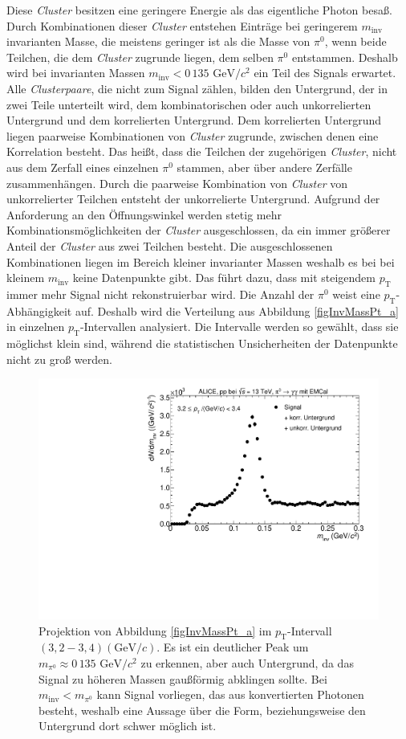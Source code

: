 Diese \textit{Cluster} besitzen eine geringere Energie als das eigentliche Photon besaß.
Durch Kombinationen dieser \textit{Cluster} entstehen Einträge bei geringerem $m_\text{inv}$
 invarianten Masse, die meistens geringer ist als die Masse von $\pi^{0}$, wenn beide Teilchen, die dem \textit{Cluster} zugrunde liegen, dem selben $\pi^{0}$ entstammen.
Deshalb wird bei invarianten Massen $m_\text{inv}<0\,135\text{ GeV}/c^{2}$ ein Teil des Signals erwartet.
\newline
Alle \textit{Clusterpaare}, die nicht zum Signal zählen, bilden den Untergrund, der in zwei Teile unterteilt wird, dem kombinatorischen oder auch unkorrelierten Untergrund und dem korrelierten Untergrund.
Dem korrelierten Untergrund liegen paarweise Kombinationen von \textit{Cluster} zugrunde, zwischen denen eine Korrelation besteht.
Das heißt, dass die Teilchen der zugehörigen \textit{Cluster}, nicht aus dem Zerfall eines einzelnen $\pi^{0}$ stammen, aber über andere Zerfälle zusammenhängen.
Durch die paarweise Kombination von \textit{Cluster} von unkorrelierter Teilchen entsteht der unkorrelierte Untergrund.
\newline
Aufgrund der Anforderung an den Öffnungswinkel werden stetig mehr Kombinationsmöglichkeiten der \textit{Cluster} ausgeschlossen, da ein immer  größerer Anteil der \textit{Cluster} aus zwei Teilchen besteht.
Die ausgeschlossenen Kombinationen liegen im Bereich kleiner invarianter Massen weshalb es bei bei kleinem $m_{\text{inv}}$ keine Datenpunkte gibt.
Das führt dazu, dass mit steigendem $p_{\text{T}}$ immer mehr Signal nicht rekonstruierbar wird.
\newline
Die Anzahl der $\pi^{0}$ weist eine $p_{\text{T}}$-Abhängigkeit auf.
Deshalb wird die Verteilung aus Abbildung \ref{figInvMassPt_a} in einzelnen $p_{\text{T}}$-Intervallen analysiert.
Die Intervalle werden so gewählt, dass sie möglichst klein sind, während die statistischen Unsicherheiten der Datenpunkte nicht zu groß werden.
\begin{figure}[tbp]
\centering
\includegraphics[width=.75\linewidth]{hSignalPlusBkg.pdf}
\caption{Projektion von Abbildung \ref{figInvMassPt_a} im $p_{\text{T}}$-Intervall $(3,2 - 3,4) (\text{GeV/}c)$. Es ist ein deutlicher Peak um $m_{\pi^{0}} \approx 0\,135\text{ GeV/}c^{2}$ zu erkennen, aber auch Untergrund, da das Signal zu höheren Massen gaußförmig abklingen sollte. Bei $m_{\text{inv}} < m_{\pi^{0}}$ kann Signal vorliegen, das aus konvertierten Photonen besteht, weshalb eine Aussage über die Form, beziehungsweise den Untergrund dort schwer möglich ist.}
\label{figSignalPlusBkg}
\end{figure}
